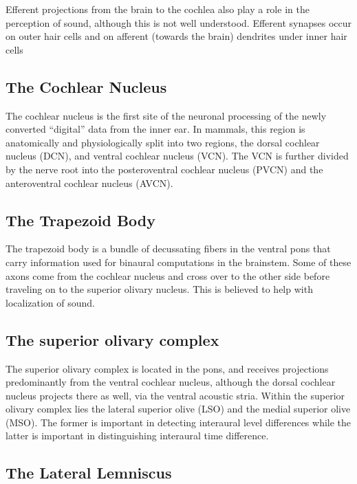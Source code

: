Efferent projections from the brain to the cochlea also play a role in the perception of sound, although this is not well understood. Efferent synapses occur on outer hair cells and on afferent (towards the brain) dendrites under inner hair cells

\hypertarget{the-cochlear-nucleus}{%
\subsection{The Cochlear Nucleus}\label{the-cochlear-nucleus}}

The cochlear nucleus is the first site of the neuronal processing of the newly converted ``digital'' data from the inner ear. In mammals, this region is anatomically and physiologically split into two regions, the dorsal cochlear nucleus (DCN), and ventral cochlear nucleus (VCN). The VCN is further divided by the nerve root into the posteroventral cochlear nucleus (PVCN) and the anteroventral cochlear nucleus (AVCN).

\hypertarget{the-trapezoid-body}{%
\subsection{The Trapezoid Body}\label{the-trapezoid-body}}

The trapezoid body is a bundle of decussating fibers in the ventral pons that carry information used for binaural computations in the brainstem. Some of these axons come from the cochlear nucleus and cross over to the other side before traveling on to the superior olivary nucleus. This is believed to help with localization of sound.

\hypertarget{the-superior-olivary-complex}{%
\subsection{The superior olivary complex}\label{the-superior-olivary-complex}}

The superior olivary complex is located in the pons, and receives projections predominantly from the ventral cochlear nucleus, although the dorsal cochlear nucleus projects there as well, via the ventral acoustic stria. Within the superior olivary complex lies the lateral superior olive (LSO) and the medial superior olive (MSO). The former is important in detecting interaural level differences while the latter is important in distinguishing interaural time difference.

\hypertarget{the-lateral-lemniscus}{%
\subsection{The Lateral Lemniscus}\label{the-lateral-lemniscus}}

